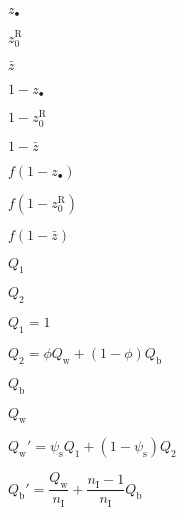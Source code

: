 \documentclass[10pt]{article}
\newcommand{\qw}{Q_\mathrm{w}}
\newcommand{\qb}{Q_\mathrm{b}}
\newcommand{\psis}{\psi_\mathrm{s}}
\newcommand{\nI}{{n_\textrm{I}}}
\begin{document}
$z_\bullet$

$z_0^{\mathrm{R}}$

$ \bar{z}$

$1-z_\bullet$

$1-z_0^{\mathrm{R}}$

$1-\bar{z}$

$f(1-z_\bullet)$

$f(1-z_0^{\mathrm{R}})$

$f(1-\bar{z})$


$Q_\mathrm{1}$

$Q_\mathrm{2}$

$Q_\mathrm{1}=1$

$Q_\mathrm{2}=\phi \qw +(1-\phi) \qb $

$\qb $

$\qw $

$\qw' = \psis Q_\mathrm{1} + (1- \psis) Q_\mathrm{2}$

$\qb' = \dfrac{ \qw }{\nI}+\dfrac{\nI-1}{\nI} \qb $
\end{document}
